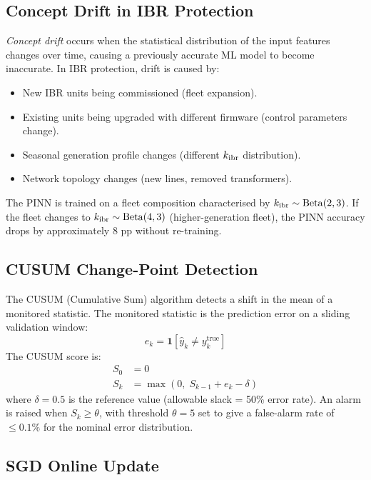 \subsection{Concept Drift in IBR Protection}

\emph{Concept drift} occurs when the statistical distribution of the
input features changes over time, causing a previously accurate ML model
to become inaccurate. In IBR protection, drift is caused by:
\begin{itemize}
\item New IBR units being commissioned (fleet expansion).
\item Existing units being upgraded with different firmware (control parameters change).
\item Seasonal generation profile changes (different $k_\mathrm{ibr}$ distribution).
\item Network topology changes (new lines, removed transformers).
\end{itemize}
The PINN is trained on a fleet composition characterised by
$k_\mathrm{ibr} \sim \mathrm{Beta}(2, 3)$. If the fleet changes to
$k_\mathrm{ibr} \sim \mathrm{Beta}(4, 3)$ (higher-generation fleet), the PINN
accuracy drops by approximately 8 pp without re-training.

\subsection{CUSUM Change-Point Detection}

The CUSUM (Cumulative Sum) algorithm \citep{Page1954} detects a shift
in the mean of a monitored statistic. The monitored statistic is the
prediction error on a sliding validation window:
\begin{equation}
  e_k = \mathbf{1}[\hat{y}_k \neq y_k^\mathrm{true}]
  \label{eq:ch8_error_stat}
\end{equation}
The CUSUM score is:
\begin{align}
  S_0 &= 0
  \label{eq:ch8_cusum_init} \\
  S_k &= \max(0,\; S_{k-1} + e_k - \delta)
  \label{eq:ch8_cusum_update}
\end{align}
where $\delta = 0.5$ is the reference value (allowable slack = 50\% error rate).
An alarm is raised when $S_k \geq \theta$, with threshold $\theta = 5$
set to give a false-alarm rate of $\leq 0.1\%$ for the nominal
error distribution.

\subsection{SGD Online Update}


